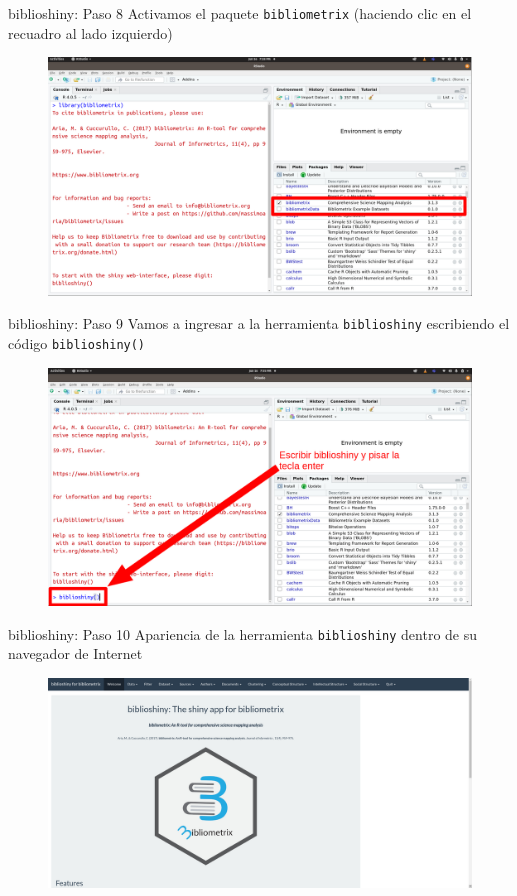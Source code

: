 \documentclass{beamer}
\begin{document}
\begin{frame}{biblioshiny: Paso 8}
Activamos el paquete \texttt{bibliometrix} (haciendo clic en el recuadro al lado izquierdo)
\begin{figure}
\centering
\includegraphics[width=.85\textwidth]{Paso7.png}
\end{figure}  
\end{frame}


\begin{frame}{biblioshiny: Paso 9}
Vamos a ingresar a la herramienta  \texttt{biblioshiny} escribiendo el código \texttt{biblioshiny()}
\begin{figure}
\centering
\includegraphics[width=.85\textwidth]{Paso8.png}
\end{figure}  
\end{frame}

\begin{frame}{biblioshiny: Paso 10}
Apariencia de la herramienta \texttt{biblioshiny} dentro de su navegador de Internet
\begin{figure}
\centering
\includegraphics[width=.95\textwidth]{Paso9.png}
\end{figure}  
\end{frame}
\end{document}
